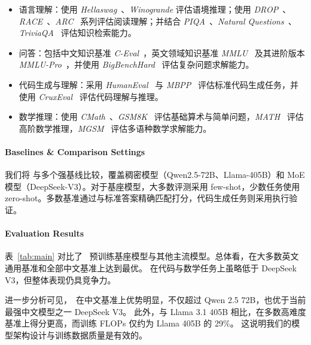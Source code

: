 \begin{itemize}[leftmargin=*]

\item 语言理解：使用 \textit{Hellaswag}~\cite{Zellers2019HellaSwagCA}、\textit{Winogrande} 评估语境推理；使用 \textit{DROP}~\cite{Dua2019DROPAR}、\textit{RACE}~\cite{Lai2017RACELR}、\textit{ARC}~\cite{Clark2018ThinkYH} 系列评估阅读理解；并结合 \textit{PIQA}~\cite{Bisk2019PIQARA}、\textit{Natural Questions}~\cite{Kwiatkowski2019NaturalQA}、\textit{TriviaQA}~\cite{Joshi2017TriviaQAAL} 评估知识检索能力。

\item 问答：包括中文知识基准 \textit{C-Eval}~\cite{Huang2023CEvalAM}，英文领域知识基准 \textit{MMLU}~\cite{Hendrycks2020MeasuringMM} 及其进阶版本 \textit{MMLU-Pro}~\cite{Wang2024MMLUProAM}，并使用 \textit{BigBenchHard}~\cite{Suzgun2022ChallengingBT} 评估复杂问题求解能力。

\item 代码生成与理解：采用 \textit{HumanEval}~\cite{Chen2021EvaluatingLL} 与 \textit{MBPP}~\cite{Austin2021ProgramSW} 评估标准代码生成任务，并使用 \textit{CruxEval}~\cite{Gu2024CRUXEvalAB} 评估代码理解与推理。

\item 数学推理：使用 \textit{CMath}~\cite{Wei2023CMATHCY}、\textit{GSM8K}~\cite{Cobbe2021TrainingVT} 评估基础算术与简单问题，\textit{MATH}~\cite{Hendrycks2021MeasuringMP} 评估高阶数学推理，\textit{MGSM}~\cite{Shi2022LanguageMA} 评估多语种数学求解能力。

\end{itemize}

\paragraph{Baselines \& Comparison Settings} 我们将 \modelname 与多个强基线比较，覆盖稠密模型（Qwen2.5-72B、Llama-405B）和 MoE 模型（DeepSeek-V3）。对于基座模型，大多数评测采用 few-shot，少数任务使用 zero-shot。多数基准通过与标准答案精确匹配打分，代码生成任务则采用执行验证。

\paragraph{Evaluation Results}
表~\ref{tab:main} 对比了 \modelname~预训练基座模型与其他主流模型。总体看，\modelname 在大多数英文通用基准和全部中文基准上达到最优。
在代码与数学任务上虽略低于 DeepSeek V3，但整体表现仍具竞争力。

进一步分析可见，\modelname~在中文基准上优势明显，不仅超过 Qwen 2.5 72B，也优于当前最强中文模型之一 DeepSeek V3。
此外，与 Llama 3.1 405B 相比，\modelname 在多数高难度基准上得分更高，而训练 FLOPs 仅约为 Llama 405B 的 29\%。
这说明我们的模型架构设计与训练数据质量是有效的。


